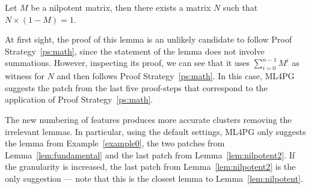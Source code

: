 \begin{lemma}\label{lem:nilpotent2}
Let $M$ be a nilpotent matrix, then there exists a matrix $N$ such that $N \times (1-M)=1$.
\end{lemma}

At first sight, the proof of this lemma is an unlikely candidate to follow  Proof Strategy~\ref{ps:math}, since the statement of the lemma
does not involve summations. However, inspecting its proof, we can see that it uses $\sum_{i=0}^{n-1} M^i$ as witness for $N$ and
then follows Proof Strategy~\ref{ps:math}. In this case, ML4PG suggests the patch from the last five proof-steps that correspond to
the application of Proof Strategy~\ref{ps:math}.

The new numbering of features produces more accurate clusters removing the irrelevant lemmas. In particular, using the default settings,
ML4PG only suggests the lemma from Example~\ref{example0}, the two patches from Lemma~\ref{lem:fundamental} and the last patch from
Lemma~\ref{lem:nilpotent2}. If the granularity is increased, the last patch from
Lemma~\ref{lem:nilpotent2} is the only suggestion --- note that this is the closest lemma to Lemma~\ref{lem:nilpotent}.
